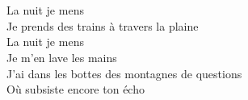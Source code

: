 \\
 \\
La nuit je mens \\
Je prends des trains à travers la plaine \\
La nuit je mens \\
Je m'en lave les mains \\
J'ai dans les bottes des montagnes de questions \\
Où subsiste encore ton écho \\
